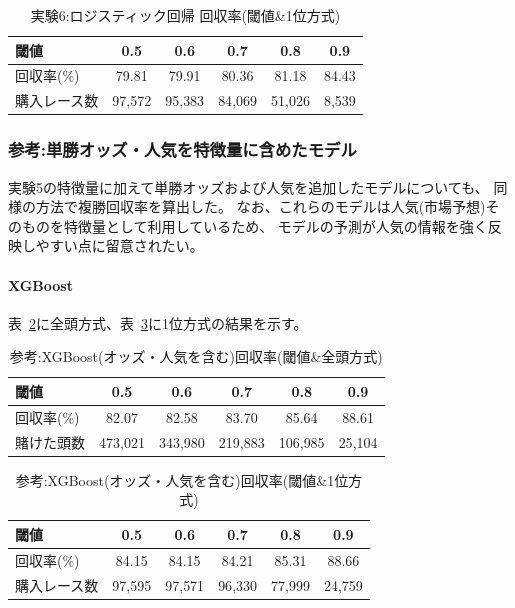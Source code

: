 \documentclass[dvipdfmx, a4paper, 11pt, titlepage]{jsarticle}
\begin{document}
\begin{table}[H]
  \centering
  \caption{実験6:ロジスティック回帰 回収率(閾値\&1位方式)}
  \label{tab:exp6_logistic_top1}
  \begin{tabular}{lccccc}
    \toprule
    閾値 & 0.5 & 0.6 & 0.7 & 0.8 & 0.9 \\
    \midrule
    回収率(\%)     & 79.81 & 79.91 & 80.36 & 81.18 & 84.43 \\
    購入レース数   & 97{,}572 & 95{,}383 & 84{,}069 & 51{,}026 & 8{,}539 \\
    \bottomrule
  \end{tabular}
\end{table}

\subsubsection{参考:単勝オッズ・人気を特徴量に含めたモデル}

実験5の特徴量に加えて単勝オッズおよび人気を追加したモデルについても、
同様の方法で複勝回収率を算出した。
なお、これらのモデルは人気(市場予想)そのものを特徴量として利用しているため、
モデルの予測が人気の情報を強く反映しやすい点に留意されたい。

\paragraph{XGBoost}

表~\ref{tab:exp6_xgb_odds_all}に全頭方式、表~\ref{tab:exp6_xgb_odds_top1}に1位方式の結果を示す。

\begin{table}[H]
  \centering
  \caption{参考:XGBoost(オッズ・人気を含む)回収率(閾値\&全頭方式)}
  \label{tab:exp6_xgb_odds_all}
  \begin{tabular}{lccccc}
    \toprule
    閾値 & 0.5 & 0.6 & 0.7 & 0.8 & 0.9 \\
    \midrule
    回収率(\%)   & 82.07 & 82.58 & 83.70 & 85.64 & 88.61 \\
    賭けた頭数   & 473{,}021 & 343{,}980 & 219{,}883 & 106{,}985 & 25{,}104 \\
    \bottomrule
  \end{tabular}
\end{table}

\begin{table}[H]
  \centering
  \caption{参考:XGBoost(オッズ・人気を含む)回収率(閾値\&1位方式)}
  \label{tab:exp6_xgb_odds_top1}
  \begin{tabular}{lccccc}
    \toprule
    閾値 & 0.5 & 0.6 & 0.7 & 0.8 & 0.9 \\
    \midrule
    回収率(\%)     & 84.15 & 84.15 & 84.21 & 85.31 & 88.66 \\
    購入レース数   & 97{,}595 & 97{,}571 & 96{,}330 & 77{,}999 & 24{,}759 \\
    \bottomrule
  \end{tabular}
\end{table}
\end{document}
